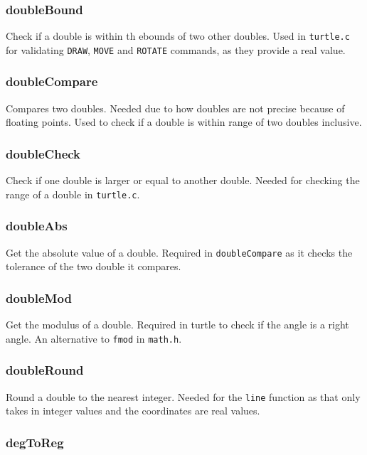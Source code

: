 \documentclass[a4paper, 12pt, titlepage]{article}
\newcommand{\code}[1]{\small\texttt{#1}\normalsize}
\begin{document}
\subsubsection{doubleBound}

Check if a double is within th ebounds of two other doubles. Used in 
\code{turtle.c} for validating \code{DRAW}, \code{MOVE} and \code{ROTATE} 
commands, as they provide a real value.

\subsubsection{doubleCompare}

Compares two doubles. Needed due to how doubles are not precise because of 
floating points. Used to check if a double is within range of two doubles 
inclusive.

\subsubsection{doubleCheck}

Check if one double is larger or equal to another double. Needed for 
checking the range of a double in \code{turtle.c}.

\subsubsection{doubleAbs}

Get the absolute value of a double. Required in \code{doubleCompare} as it 
checks the tolerance of the two double it compares.

\subsubsection{doubleMod}

Get the modulus of a double. Required in turtle to check if the angle is 
a right angle. An alternative to \code{fmod} in \code{math.h}.

\subsubsection{doubleRound}

Round a double to the nearest integer. Needed for the \code{line} function 
as that only takes in integer values and the coordinates are real values.

\subsubsection{degToReg}
\end{document}
